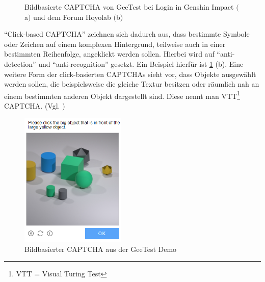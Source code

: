 \begin{figure}[h!]
    \centering
    \qquad
    \caption{Bildbasierte CAPTCHA von GeeTest bei Login in Genshin Impact $($a$)$ und dem Forum Hoyolab $($b$)$}   
    \label{fig:genshin}
\end{figure}

``Click-based CAPTCHA'' zeichnen sich dadurch aus, dass bestimmte Symbole oder Zeichen auf einem komplexen Hintergrund, 
teilweise auch in einer bestimmten Reihenfolge, angeklickt werden sollen.
Hierbei wird auf ``anti-detection'' und ``anti-recognition'' gesetzt. \cite[p.77]{surveyofresearch}
Ein Beispiel hierfür ist \ref{fig:genshin} (b).
Eine weitere Form der click-basierten CAPTCHAs sieht vor, dass Objekte ausgewählt werden sollen,
die beispielsweise die gleiche Textur besitzen oder räumlich nah an einem bestimmten anderen Objekt dargestellt sind. 
Diese nennt man VTT\footnote[1]{VTT = Visual Turing Test} CAPTCHA. (Vgl. \cite[p.78]{surveyofresearch})

\begin{figure}[h!]
        \centering
        \includegraphics[width=5cm]{gfx/mygraphics/raeumlich.png} 
    \caption{Bildbasierter CAPTCHA aus der GeeTest Demo}
    \label{fig:geetest}
\end{figure}

